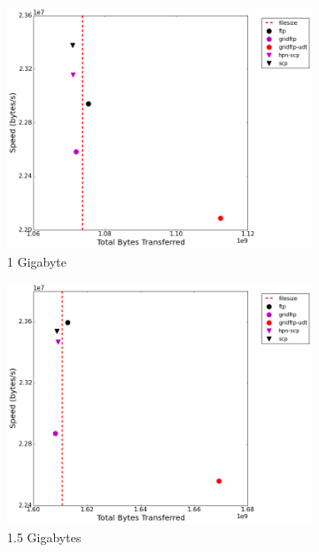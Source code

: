 \documentclass{sig-alternate-05-2015}
\begin{document}
\begin{figure}[t]
\begin{subfigure}{.3\linewidth}
	\includegraphics[width=\linewidth]{img/speed_bytes/1G.png}
	\caption{1 Gigabyte}
	\label{speed_bytes_1G}
	\end{subfigure}
	\begin{subfigure}{.3\linewidth}
	\includegraphics[width=\linewidth]{img/speed_bytes/1_5G.png}
	\caption{1.5 Gigabytes}
	\label{speed_bytes_1_5G}
	\end{subfigure}
	\begin{subfigure}{.3\linewidth}

\end{subfigure}
\end{figure}
\end{document}
